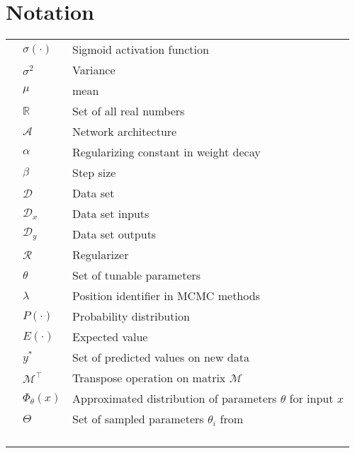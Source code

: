\chapter{Notation}

\begin{table}[H]
\renewcommand\arraystretch{1.5}

\begin{tabular}{lll}

&$\sigma(\cdot)$ & Sigmoid activation function \\
&$\sigma^2$ & Variance \\
&$\mu$ & mean \\
&$\mathbb{R}$ & Set of all real numbers \\
&$\mathcal{A}$ & Network architecture \\
&$\alpha$ & Regularizing constant in weight decay \\
&$\beta$ & Step size \\
&$\mathcal{D}$ & Data set \\
&$\mathcal{D}_x$ & Data set inputs \\
&$\mathcal{D}_y$ & Data set outputs \\
&$\mathcal{R}$ & Regularizer \\
&$\theta$ & Set of tunable parameters \\
&$\lambda$ & Position identifier in MCMC  methods \\
&$P(\cdot)$ & Probability distribution \\
&$E(\cdot)$ & Expected value \\
&$y^*$ & Set of predicted values on new data \\
&$\mathcal{M}^\intercal$ & Transpose operation on matrix $\mathcal{M}$ \\
&$\Phi_\theta(x)$ & Approximated distribution of parameters $\theta$ for input $x$\\
&$\Theta$ & Set of sampled parameters $\theta_i$ from \\
&$ $ & \\
&$ $ & \\
&$ $ & \\
&$ $ & \\
\end{tabular}

\end{table}
